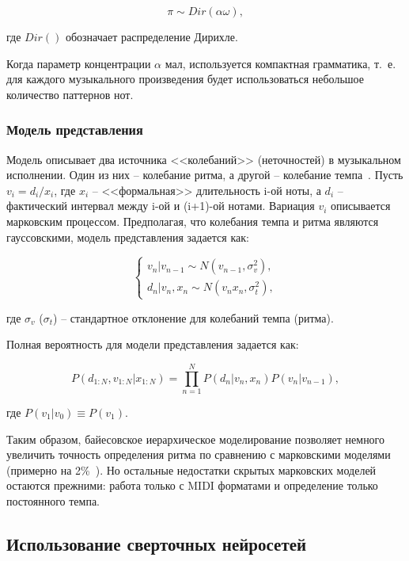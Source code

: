 \begin{equation}
	\pi \sim Dir(\alpha\omega),
\end{equation}

где $Dir()$ обозначает распределение Дирихле.

Когда параметр концентрации $\alpha$ мал, используется компактная грамматика, т.~е. для каждого музыкального произведения будет использоваться небольшое количество паттернов нот.

\subsubsection{Модель представления}

Модель описывает два источника <<колебаний>> (неточностей) в музыкальном исполнении. Один из них -- колебание ритма, а другой -- колебание темпа~\cite{bayesian}. Пусть $v_i = d_i / x_i$, где $x_i$ -- <<формальная>> длительность i-ой ноты, а $d_i$ -- фактический интервал между i-ой и (i+1)-ой нотами. Вариация $v_i$ описывается марковским процессом. Предполагая, что колебания темпа и ритма являются гауссовскими, модель представления задается как:

\begin{equation}
	\begin{cases}
		v_n|v_{n-1} \sim N(v_{n-1}, \sigma_v^2),\\
		d_n|v_n, x_n \sim N(v_nx_n, \sigma_t^2),
	\end{cases}
\end{equation}

где $\sigma_v$ ($\sigma_t$) -- стандартное отклонение для колебаний темпа (ритма).

Полная вероятность для модели представления задается как:

\begin{equation}
	P(d_{1:N}, v_{1:N}|x_{1:N}) = \prod_{n=1}^N P(d_n|v_n, x_n)P(v_n|v_{n-1}),
\end{equation}

где $P(v_1|v_0) \equiv P(v_1)$.

Таким образом, байесовское иерархическое моделирование позволяет немного увеличить точность определения ритма по сравнению с марковскими моделями (примерно на 2\%~\cite{bayesian}). Но остальные недостатки скрытых марковских моделей остаются прежними: работа только с MIDI форматами и определение только постоянного темпа.

\subsection{Использование сверточных нейросетей}

